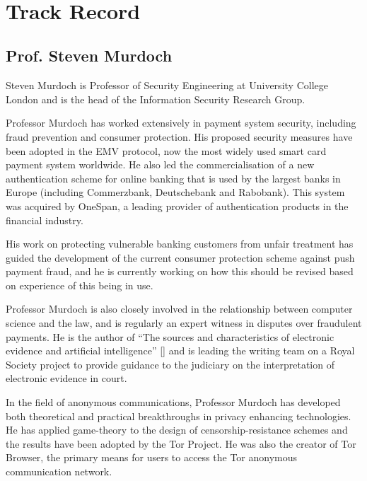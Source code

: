 
\



\section{Track Record}

\subsection{Prof. Steven Murdoch}

Steven Murdoch is Professor of Security Engineering at University College London and is the head of the Information Security Research Group. 

Professor Murdoch has worked extensively in payment system security, including fraud prevention and consumer protection.
His proposed security measures have been adopted in the EMV protocol, now the most widely used smart card payment system worldwide.
He also led the commercialisation of a new authentication scheme for online banking that is used by the largest banks in Europe (including Commerzbank, Deutschebank and Rabobank).
This system was acquired by OneSpan, a leading provider of authentication products in the financial industry.

His work on protecting vulnerable banking customers from unfair treatment has guided the development of the current consumer protection scheme against push payment fraud, and he is currently working on how this should be revised based on experience of this being in use.

Professor Murdoch is also closely involved in the relationship between computer science and the law, and is regularly an expert witness in disputes over fraudulent payments.
He is the author of ``The sources and characteristics of electronic evidence and artificial intelligence'' \href{https://humanities-digital-library.org/index.php/hdl/catalog/book/electronic-evidence-and-electronic-signatures}{[\x]} and is leading the writing team on a Royal Society
project to provide guidance to the judiciary on the interpretation of electronic evidence in court.

In the field of anonymous communications, Professor Murdoch has developed both theoretical and practical breakthroughs in privacy enhancing technologies.
He has applied game-theory to the design of censorship-resistance schemes and the results have been adopted by the Tor Project.
He was also the creator of Tor Browser, the primary means for users to access the Tor anonymous communication network.

